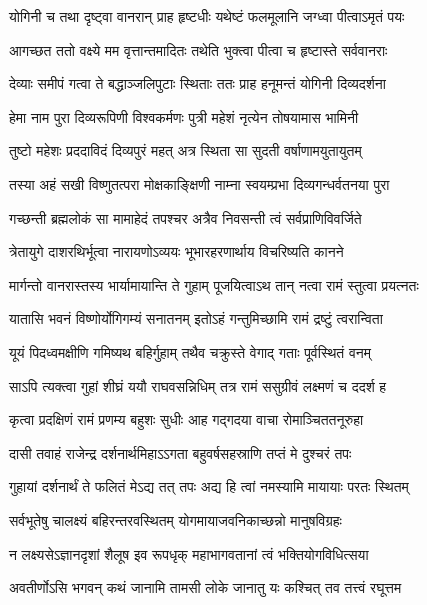 \twolineshloka
{योगिनी च तथा दृष्ट्वा वानरान् प्राह हृष्टधीः}
{यथेष्टं फलमूलानि जग्ध्वा पीत्वाऽमृतं पयः} %

\twolineshloka
{आगच्छत ततो वक्ष्ये मम वृत्तान्तमादितः}
{तथेति भुक्त्वा पीत्वा च हृष्टास्ते सर्ववानराः} %

\twolineshloka
{देव्याः समीपं गत्वा ते बद्धाञ्जलिपुटाः स्थिताः}
{ततः प्राह हनूमन्तं योगिनी दिव्यदर्शना} %

\twolineshloka
{हेमा नाम पुरा दिव्यरूपिणी विश्वकर्मणः}
{पुत्री महेशं नृत्येन तोषयामास भामिनी} %

\twolineshloka
{तुष्टो महेशः प्रददाविदं दिव्यपुरं महत्}
{अत्र स्थिता सा सुदती वर्षाणामयुतायुतम्} %

\twolineshloka
{तस्या अहं सखी विष्णुतत्परा मोक्षकाङ्क्षिणी}
{नाम्ना स्वयम्प्रभा दिव्यगन्धर्वतनया पुरा} %

\twolineshloka
{गच्छन्ती ब्रह्मलोकं सा मामाहेदं तपश्चर}
{अत्रैव निवसन्ती त्वं सर्वप्राणिविवर्जिते} %

\twolineshloka
{त्रेतायुगे दाशरथिर्भूत्वा नारायणोऽव्ययः}
{भूभारहरणार्थाय विचरिष्यति कानने} %

\twolineshloka
{मार्गन्तो वानरास्तस्य भार्यामायान्ति ते गुहाम्}
{पूजयित्वाऽथ तान् नत्वा रामं स्तुत्वा प्रयत्नतः} %

\twolineshloka
{यातासि भवनं विष्णोर्योगिगम्यं सनातनम्}
{इतोऽहं गन्तुमिच्छामि रामं द्रष्टुं त्वरान्विता} %

\twolineshloka
{यूयं पिदध्वमक्षीणि गमिष्यथ बहिर्गुहाम्}
{तथैव चक्रुस्ते वेगाद् गताः पूर्वस्थितं वनम्} %

\twolineshloka
{साऽपि त्यक्त्वा गुहां शीघ्रं ययौ राघवसन्निधिम्}
{तत्र रामं ससुग्रीवं लक्ष्मणं च ददर्श ह} %

\twolineshloka
{कृत्वा प्रदक्षिणं रामं प्रणम्य बहुशः सुधीः}
{आह गद्गदया वाचा रोमाञ्चिततनूरुहा} %

\twolineshloka
{दासी तवाहं राजेन्द्र दर्शनार्थमिहाऽऽगता}
{बहुवर्षसहस्राणि तप्तं मे दुश्चरं तपः} %

\twolineshloka
{गुहायां दर्शनार्थं ते फलितं मेऽद्य तत् तपः}
{अद्य हि त्वां नमस्यामि मायायाः परतः स्थितम्} %

\twolineshloka
{सर्वभूतेषु चालक्ष्यं बहिरन्तरवस्थितम्}
{योगमायाजवनिकाच्छन्नो मानुषविग्रहः} %

\twolineshloka
{न लक्ष्यसेऽज्ञानदृशां शैलूष इव रूपधृक्}
{महाभागवतानां त्वं भक्तियोगविधित्सया} %

\twolineshloka
{अवतीर्णोऽसि भगवन् कथं जानामि तामसी}
{लोके जानातु यः कश्चित् तव तत्त्वं रघूत्तम} %

